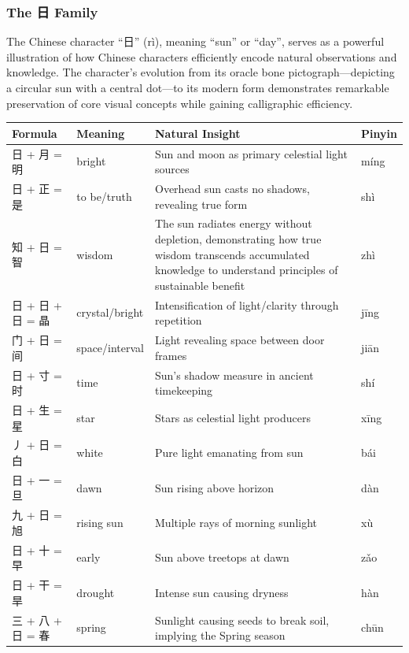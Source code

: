 \documentclass[11pt,letterpaper]{article}
\begin{document}
\subsubsection{The 日 Family}\label{the-ux65e5-family}

The Chinese character ``日'' (rì), meaning ``sun'' or ``day'', serves as
a powerful illustration of how Chinese characters efficiently encode
natural observations and knowledge. The character's evolution from its
oracle bone pictograph---depicting a circular sun with a central
dot---to its modern form demonstrates remarkable preservation of core
visual concepts while gaining calligraphic efficiency.

\begin{longtable}{|p{3cm}|p{3cm}|p{6cm}|p{2cm}|}
\hline
\textbf{Formula} & \textbf{Meaning} & \textbf{Natural Insight} & \textbf{Pinyin} \\
\hline
日 + 月 = 明 & bright & Sun and moon as primary celestial light sources & míng \\
\hline
日 + 正 = 是 & to be/truth & Overhead sun casts no shadows, revealing true form & shì \\
\hline
知 + 日 = 智 & wisdom & The sun radiates energy without depletion,
demonstrating how true wisdom transcends accumulated knowledge to
understand principles of sustainable benefit & zhì \\
\hline
日 + 日 + 日 = 晶 & crystal/bright & Intensification of light/clarity through repetition & jīng \\
\hline
门 + 日 = 间 & space/interval & Light revealing space between door frames & jiān \\
\hline
日 + 寸 = 时 & time & Sun's shadow measure in ancient timekeeping & shí \\
\hline
日 + 生 = 星 & star & Stars as celestial light producers & xīng \\
\hline
丿 + 日 = 白 & white & Pure light emanating from sun & bái \\
\hline
日 + 一 = 旦 & dawn & Sun rising above horizon & dàn \\
\hline
九 + 日 = 旭 & rising sun & Multiple rays of morning sunlight & xù \\
\hline
日 + 十 = 早 & early & Sun above treetops at dawn & zǎo \\
\hline
日 + 干 = 旱 & drought & Intense sun causing dryness & hàn \\
\hline
三 + 八 + 日 = 春 & spring & Sunlight causing seeds to break soil, implying the Spring season &
chūn \\
\hline
\end{longtable}
\end{document}
